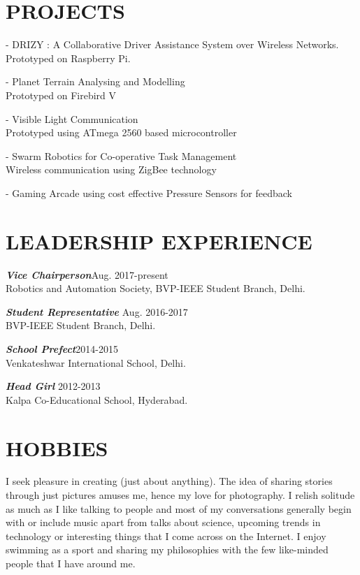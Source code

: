 \documentclass[margin, 10pt]{res} %
\begin{document}
\begin{resume}
\section{PROJECTS}
- DRIZY : A Collaborative Driver Assistance System over Wireless Networks.\\
Prototyped on Raspberry Pi.

- Planet Terrain Analysing and Modelling \\Prototyped on Firebird V

- Visible Light Communication\\
Prototyped using ATmega 2560 based microcontroller


- Swarm Robotics for Co-operative Task Management\\ Wireless communication using ZigBee technology

- Gaming Arcade using cost effective Pressure Sensors for feedback


\section{LEADERSHIP EXPERIENCE}
{\sl {\bf Vice Chairperson}}\hfill Aug. 2017-present \\
Robotics and Automation Society, BVP-IEEE Student Branch, Delhi.

{\sl {\bf Student Representative}} \hfill Aug. 2016-2017\\ BVP-IEEE Student Branch, Delhi.

{\sl {\bf School Prefect}}\hfill 2014-2015\\
Venkateshwar International School, Delhi.

{\sl {\bf Head Girl}} \hfill 2012-2013\\ Kalpa Co-Educational School, Hyderabad.


\section{HOBBIES}
I seek pleasure in creating (just about anything). The idea of sharing stories through just pictures amuses me, hence my love for photography. I relish solitude as much as I like talking to people and most of my conversations generally begin with or include music apart from talks about science, upcoming trends in technology or interesting things that I come across on the Internet. I enjoy swimming as a sport and sharing my philosophies with the few like-minded people that I have around me.

\end{resume}
\end{document}
